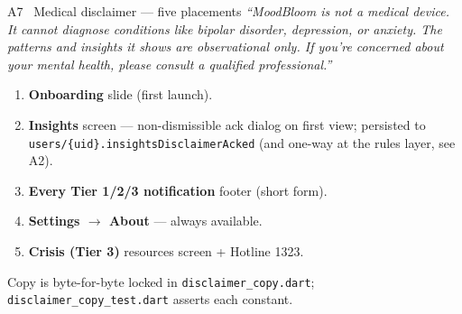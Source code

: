 \documentclass[aspectratio=169,11pt]{beamer}
\begin{document}
\begin{frame}{A7 \textperiodcentered\ Medical disclaimer --- five placements}
{\footnotesize\itshape ``MoodBloom is not a medical device. It cannot diagnose conditions like bipolar disorder, depression, or anxiety. The patterns and insights it shows are observational only. If you're concerned about your mental health, please consult a qualified professional.''}
\vspace{0.4em}
\begin{enumerate}\footnotesize
  \item \textbf{Onboarding} slide (first launch).
  \item \textbf{Insights} screen --- non-dismissible ack dialog on first view; persisted to \texttt{users/\{uid\}.insightsDisclaimerAcked} (and one-way at the rules layer, see A2).
  \item \textbf{Every Tier 1/2/3 notification} footer (short form).
  \item \textbf{Settings $\to$ About} --- always available.
  \item \textbf{Crisis (Tier 3)} resources screen + Hotline 1323.
\end{enumerate}
\vfill
{\footnotesize\color{gray!70} Copy is byte-for-byte locked in \texttt{disclaimer\_copy.dart}; \texttt{disclaimer\_copy\_test.dart} asserts each constant.}
\end{frame}
\end{document}

